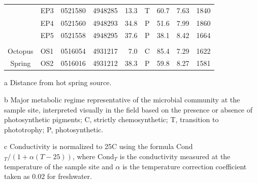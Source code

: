 {\begin{table}[htbp]
\begin{adjustbox}{width=\textwidth,keepaspectratio}
\begin{threeparttable}
\begin{tabular}{clccrcccc}
      & EP3   & 0521580 & 4948285 & 13.3  & T     & 60.7  & 7.63  & 1840 \\
      & EP4   & 0521560 & 4948293 & 34.8  & P     & 51.6  & 7.99  & 1860 \\
      & EP5   & 0521558 & 4948295 & 37.6  & P     & 38.1  & 8.42  & 1664 \\
      &       &       &       &       &       &       &       &  \\
Octopus & OS1   & 0516054 & 4931217 & 7.0   & C     & 85.4  & 7.29  & 1622 \\
Spring & OS2   & 0516016 & 4931212 & 38.3  & P     & 59.8  & 8.27  & 1581 \\
\bottomrule
\end{tabular}%

    \begin{tablenotes}
      \small
      \item[a] Distance from hot spring source.
      \item[b] Major metabolic regime representative of the microbial community at the sample site, interpreted visually in the field based on the presence or absence of photosynthetic pigments; C, strictly chemosynthetic; T, transition to phototrophy; P, photosynthetic.
      \item[c] Conductivity is normalized to 25\degree C using the formula Cond$_{T}/(1+\alpha(T-25))$, where Cond$_{T}$ is the conductivity measured at the temperature of the sample site and $\alpha$ is the temperature correction coefficient taken as 0.02 for freshwater.
    \end{tablenotes}
  \label{tab:geophysical}%
  \end{threeparttable}
  \end{adjustbox}
\end{table}%
\doublespace
\clearpage
}




